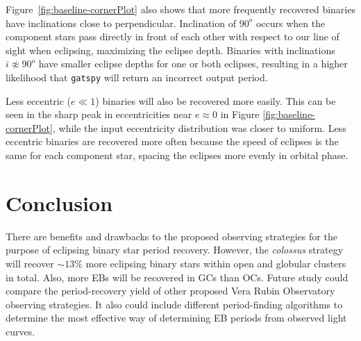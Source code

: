 \documentclass[RNAAS]{aastex63}
\begin{document}
 Figure~\ref{fig:baseline-cornerPlot} also shows that more frequently recovered binaries have inclinations close to perpendicular. Inclination of $90^o$ occurs when the component stars pass directly in front of each other with respect to our line of sight when eclipsing, maximizing the eclipse depth. Binaries with inclinations $i \not\approx 90^o$ have smaller eclipse depths for one or both eclipses, resulting in a higher likelihood that \texttt{gatspy} will return an incorrect output period.

Less eccentric ($e \ll 1$) binaries will also be recovered more easily. This can be seen in the sharp peak in eccentricities near $e \approx 0$ in Figure \ref{fig:baseline-cornerPlot}, while the input eccentricity distribution was closer to uniform. Less eccentric binaries are recovered more often because the speed of eclipses is the same for each component star, spacing the eclipses more evenly in orbital phase. 

\begin{figure*}
    \centering

    \caption{Corner plot for the \textit{baseline}-\textit{recovered} populations for OCs (red) and GCs (blue). These binaries were selected for orbital periods less than $p < 1000$ days. Most recovered binaries have periods less than 1000 days, justifying the selection. The binary parameters plotted are (from left to right on the x-axis): $\log_{10}$ of the orbital period $p$ in days, binary primary component mass $m_1 (M_{\odot})$, binary secondary mass $m_2 (M_{\odot})$, binary primary component radius $R_1 (R_{\odot})$, binary secondary component radius $r_2 (R_{\odot})$, binary eccentricity $e$, inclination $i$ (deg), mean apparent magnitude in the r-band. The 1-dimensional histograms along the diagonal show individual parameter probability density distributions.}
    \label{fig:baseline-cornerPlot}
\end{figure*}

\section{Conclusion}
\label{sec:Conclusion}
There are benefits and drawbacks to the proposed observing strategies for the purpose of eclipsing binary star period recovery. However, the \textit{colossus} strategy will recover $\sim 13\%$ more eclipsing binary stars within open and globular clusters in total. Also, more EBs will be recovered in GCs than OCs. Future study could compare the period-recovery yield of other proposed Vera Rubin Observatory observing strategies. It also could include different period-finding algorithms to determine the most effective way of determining EB periods from observed light curves.
\end{document}
